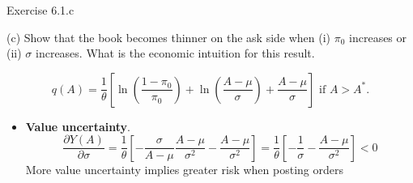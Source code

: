 \documentclass[english,10pt
,aspectratio=169
]{beamer}
\begin{document}
\begin{frame}{Exercise 6.1.c}
	\begin{exampleblock}{}
		(c) Show that the book becomes thinner on the ask side when (i) $\pi_0$ increases or (ii) $\sigma$ increases. What is the economic intuition for this result.
	\end{exampleblock}

	$$
		q(A)=\frac{1}{\theta} \left[\ln \left(\frac{1-\pi_0}{\pi_0}\right) + \ln \left(\frac{A-\mu}{\sigma}\right) + \frac{A-\mu}{\sigma}\right]\text{ if } A>A^*.
	$$
	
	\begin{itemize}
		\item \textbf{Value uncertainty}. 
		\[
		\frac{\partial Y(A)}{\partial \sigma} = \frac{1}{\theta} \left[ -\frac{\sigma}{A-\mu}\frac{A-\mu}{\sigma^2} - \frac{A-\mu}{\sigma^2}\right]=\frac{1}{\theta} \left[ -\frac{1}{\sigma} - \frac{A-\mu}{\sigma^2}\right]<0
		\]
		More value uncertainty implies greater risk when posting orders
	\end{itemize}
\end{frame}
\end{document}
